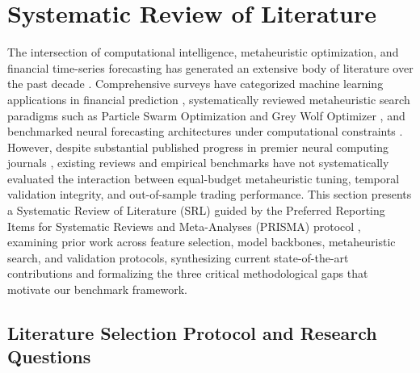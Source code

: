 
\section{Systematic Review of Literature}\label{sec:literature_review}

The intersection of computational intelligence, metaheuristic optimization, and financial time-series forecasting has generated an extensive body of literature over the past decade \cite{henrique2019stock_review, rajwar2023exhaustive_review, jiang2021applications}. Comprehensive surveys have categorized machine learning applications in financial prediction \cite{henrique2019stock_review, jiang2021applications}, systematically reviewed metaheuristic search paradigms such as Particle Swarm Optimization \cite{gad2022pso_comprehensive, wang2018pso_comprehensive} and Grey Wolf Optimizer \cite{faris2018gwo_review}, and benchmarked neural forecasting architectures under computational constraints \cite{dhingra2025solar, jovanovic2024wann}. However, despite substantial published progress in premier neural computing journals \cite{billah2024nca_moving_average, bandgar2025finchronos, al_bannoud2026accelerating, bashir2026evobagnet}, existing reviews and empirical benchmarks have not systematically evaluated the interaction between equal-budget metaheuristic tuning, temporal validation integrity, and out-of-sample trading performance. This section presents a Systematic Review of Literature (SRL) guided by the Preferred Reporting Items for Systematic Reviews and Meta-Analyses (PRISMA) protocol \cite{page2021prisma}, examining prior work across feature selection, model backbones, metaheuristic search, and validation protocols, synthesizing current state-of-the-art contributions and formalizing the three critical methodological gaps that motivate our benchmark framework.

\subsection{Literature Selection Protocol and Research Questions}\label{subsec:selection_protocol}

